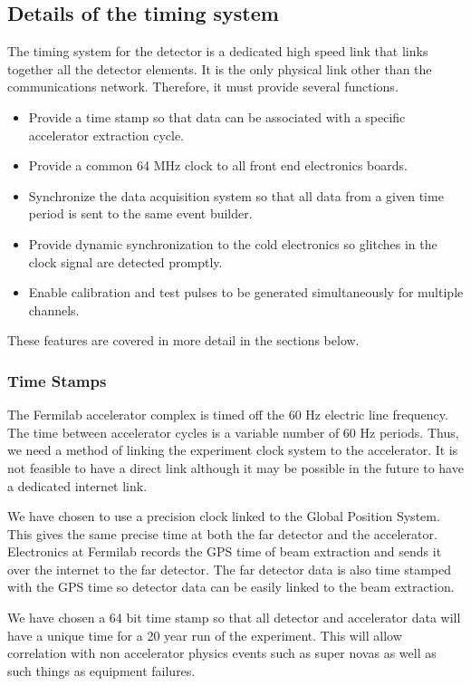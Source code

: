 \subsection{Details of the timing system}

The timing system for the detector is a dedicated high speed link that
links together all the detector elements.  It is the only physical
link other than the communications network.  Therefore, it must
provide several functions.

\begin{itemize}
\item Provide a time stamp so that data can be associated with a
  specific accelerator extraction cycle.
\item Provide a common 64 MHz clock to all front end electronics
  boards.
\item Synchronize the data acquisition system so that all data from a
  given time period is sent to the same event builder.
\item Provide dynamic synchronization to the cold electronics so
  glitches in the clock signal are detected promptly.
\item Enable calibration and test pulses to be generated
  simultaneously for multiple channels.
\end{itemize}

These features are covered in more detail in the sections below.

\subsubsection{Time Stamps}

The Fermilab accelerator complex is timed off the 60 Hz electric line
frequency.  The time between accelerator cycles is a variable number
of 60 Hz periods.  Thus, we need a method of linking the experiment
clock system to the accelerator.  It is not feasible to have a direct
link although it may be possible in the future to have a dedicated
internet link.

We have chosen to use a precision clock linked to the Global Position
System.  This gives the same precise time at both the far detector and
the accelerator.  Electronics at Fermilab records the GPS time of beam
extraction and sends it over the internet to the far detector.  The
far detector data is also time stamped with the GPS time so detector
data can be easily linked to the beam extraction.

We have chosen a 64 bit time stamp so that all detector and
accelerator data will have a unique time for a 20 year run of the
experiment.  This will allow correlation with non accelerator physics
events such as super novas as well as such things as equipment
failures.

